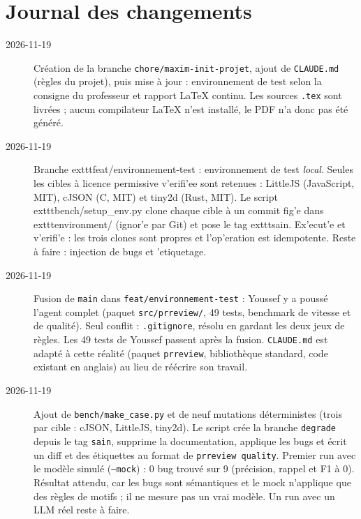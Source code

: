 \section{Journal des changements}
\begin{description}
  \item[2026-11-19] Cr\'eation de la branche \texttt{chore/maxim-init-projet}, ajout de \texttt{CLAUDE.md} (r\`egles du projet), puis mise \`a jour : environnement de test selon la consigne du professeur et rapport LaTeX continu. Les sources \texttt{.tex} sont livr\'ees ; aucun compilateur LaTeX n'est install\'e, le PDF n'a donc pas \'et\'e g\'en\'er\'e.
  \item[2026-11-19] Branche 	exttt{feat/environnement-test} : environnement de test \emph{local}. Seules les cibles \`a licence permissive v'erifi'ee sont retenues : LittleJS (JavaScript, MIT), cJSON (C, MIT) et tiny2d (Rust, MIT). Le script 	exttt{bench/setup\_env.py} clone chaque cible \`a un commit fig'e dans 	exttt{environment/} (ignor'e par Git) et pose le tag 	exttt{sain}. Ex'ecut'e et v'erifi'e : les trois clones sont propres et l'op'eration est idempotente. Reste \`a faire : injection de bugs et 'etiquetage.
  \item[2026-11-19] Fusion de \texttt{main} dans \texttt{feat/environnement-test} : Youssef y a pouss\'e l'agent complet (paquet \texttt{src/prreview/}, 49 tests, benchmark de vitesse et de qualit\'e). Seul conflit : \texttt{.gitignore}, r\'esolu en gardant les deux jeux de r\`egles. Les 49 tests de Youssef passent apr\`es la fusion. \texttt{CLAUDE.md} est adapt\'e \`a cette r\'ealit\'e (paquet \texttt{prreview}, biblioth\`eque standard, code existant en anglais) au lieu de r\'e\'ecrire son travail.
  \item[2026-11-19] Ajout de \texttt{bench/make\_case.py} et de neuf mutations d\'eterministes (trois par cible : cJSON, LittleJS, tiny2d). Le script cr\'ee la branche \texttt{degrade} depuis le tag \texttt{sain}, supprime la documentation, applique les bugs et \'ecrit un diff et des \'etiquettes au format de \texttt{prreview quality}. Premier run avec le mod\`ele simul\'e (\texttt{--mock}) : 0 bug trouv\'e sur 9 (pr\'ecision, rappel et F1 \`a 0). R\'esultat attendu, car les bugs sont s\'emantiques et le mock n'applique que des r\`egles de motifs ; il ne mesure pas un vrai mod\`ele. Un run avec un LLM r\'eel reste \`a faire.
\end{description}

